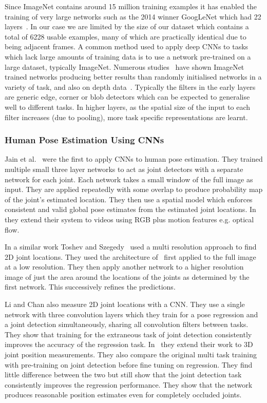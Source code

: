 \documentclass[11pt]{article} %
\begin{document}
Since ImageNet contains around 15 million training examples it has enabled the training of very large networks such as the 2014 winner GoogLeNet which had 22 layers~\cite{Szegedy2014}. In our case we are limited by the size of our dataset which contains a total of 6228 usable examples, many of which are practically identical due to being adjacent frames. A common method used to apply deep CNNs to tasks which lack large amounts of training data is to use a network pre-trained on a large dataset, typically ImageNet. Numerous studies~\cite{Sharif2014,Donahue2014,Oquab2014,Girshick2014,Yosinski2014} have shown ImageNet trained networks producing better results than randomly initialised networks in a variety of task, and also on depth data~\cite{Schwarz2015,Alexandre2013}. Typically the filters in the early layers are generic edge, corner or blob detectors which can be expected to generalise well to different tasks. In higher layers, as the spatial size of the input to each filter increases (due to pooling), more task specific representations are learnt. 

\subsubsection{Human Pose Estimation Using CNNs}

 

Jain et al.~\cite{Jain2013a} were the first to apply CNNs to human pose estimation. They trained multiple small three layer networks to act as joint detectors with a separate network for each joint. Each network takes a small window of the full image as input. They are applied repeatedly with some overlap to produce probability map of the joint's estimated location. They then use a spatial model which enforces consistent and valid global pose estimates from the estimated joint locations. In~\cite{Jain2014} they extend their system to videos using RGB plus motion features e.g. optical flow. 

In a similar work Toshev and Szegedy~\cite{Toshev} used a multi resolution approach to find 2D joint locations. They used the architecture of~\cite{Krizhevsky2012} first applied to the full image at a low resolution. They then apply another network to a higher resolution image of just the area around the locations of the joints as determined by the first network. This successively refines the predictions. 

Li and Chan also measure 2D joint locations with a CNN. They use a single network with three convolution layers which they train for a pose regression and a joint detection simultaneously, sharing all convolution filters between tasks. They show that training for the extraneous task of joint detection consistently improves the accuracy of the regression task. In~\cite{Accv2014} they extend their work to 3D joint position measurements. They also compare the original multi task training with pre-training on joint detection before fine tuning on regression. They find little difference between the two but still show that the joint detection task consistently improves the regression performance. They show that the network produces reasonable position estimates even for completely occluded joints. 
\end{document}
